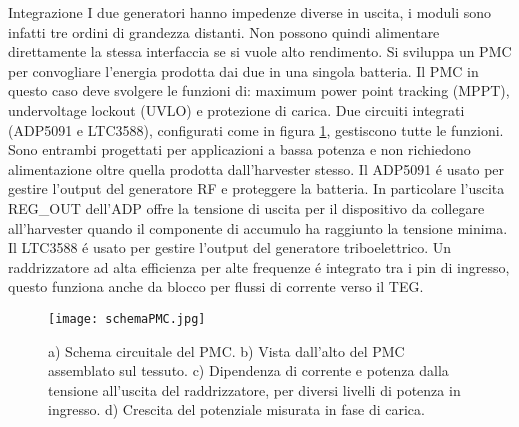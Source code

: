 \begin{section}{Integrazione}
    I due generatori hanno impedenze diverse in uscita, i moduli sono infatti tre ordini di grandezza distanti. Non possono quindi alimentare direttamente la stessa interfaccia se si vuole alto rendimento. Si sviluppa un PMC per convogliare l'energia prodotta dai due in una singola batteria. Il PMC in questo caso deve svolgere le funzioni di: maximum power point tracking (MPPT), undervoltage lockout (UVLO) e protezione di carica. Due circuiti integrati (ADP5091 e LTC3588), configurati come in figura \ref{fig:schemaPMC}, gestiscono tutte le funzioni. Sono entrambi progettati per applicazioni a bassa potenza e non richiedono alimentazione oltre quella prodotta dall'harvester stesso. Il ADP5091 \'e usato per gestire l'output del generatore RF e proteggere la batteria. In particolare l'uscita REG\_OUT dell'ADP offre la tensione di uscita per il dispositivo da collegare all'harvester quando il componente di accumulo ha raggiunto la tensione minima. Il LTC3588 \'e usato per gestire l'output del generatore triboelettrico. Un raddrizzatore ad alta efficienza per alte frequenze \'e integrato  tra i pin di ingresso, questo funziona anche da blocco per flussi di corrente verso il TEG.

    \begin{figure}[hbt!]
        \texttt{[image: schemaPMC.jpg]}
        \centering
        \caption{a) Schema circuitale del PMC. b) Vista dall'alto del PMC assemblato sul tessuto. c) Dipendenza di corrente e potenza dalla tensione all'uscita del raddrizzatore, per diversi livelli di potenza in ingresso. d) Crescita del potenziale misurata in fase di carica.\cite{kouWearableAllFabricHybrid2024}}
        \label{fig:schemaPMC}
    \end{figure}


\end{section}
